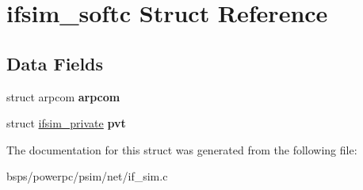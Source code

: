 \hypertarget{structifsim__softc}{}\section{ifsim\+\_\+softc Struct Reference}
\label{structifsim__softc}
\subsection*{Data Fields}
\begin{DoxyCompactItemize}
\item 
\mbox{\label{structifsim__softc_a9b35efe5f17ac5986c376797165e1c39}} 
struct arpcom {\bfseries arpcom}
\item 
\mbox{\label{structifsim__softc_a9adeba1c85edcf8e375495d6ee97f74d}} 
struct \mbox{\hyperlink{structifsim__private}{ifsim\+\_\+private}} {\bfseries pvt}
\end{DoxyCompactItemize}


The documentation for this struct was generated from the following file\+:\begin{DoxyCompactItemize}
\item 
bsps/powerpc/psim/net/if\+\_\+sim.\+c\end{DoxyCompactItemize}
